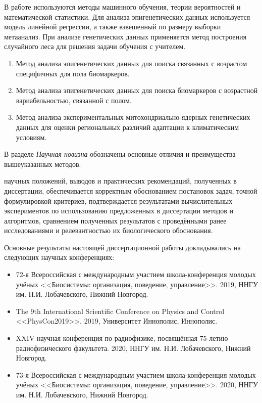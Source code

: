 {\methods} В работе используются методы машинного обучения, теории вероятностей и математической статистики. Для анализа эпигенетических данных используется модель линейной регрессии, а также взвешенный по размеру выборки метаанализ. При анализе генетических данных применяется метод построения случайного леса для решения задачи обучения с учителем. 

{}
\begin{enumerate}[beginpenalty=10000]
	\item Метод анализа эпигенетических данных для поиска связанных с возрастом специфичных для пола биомаркеров.
	\item Метод анализа эпигенетических данных для поиска биомаркеров с возрастной вариабельностью, связанной с полом.
	\item Метод анализа экспериментальных митохондриально-ядерных генетических данных для оценки региональных различий адаптации к климатическим условиям.
\end{enumerate}

В разделе \textit{Научная новизна} обозначены основные отличия и преимущества вышеуказанных методов.

{\reliability} научных положений, выводов и практических рекомендаций, полученных в диссертации, обеспечивается корректным обоснованием постановок задач, точной формулировкой критериев,  подтверждается результатами вычислительных экспериментов по использованию предложенных в диссертации методов и алгоритмов, сравнением полученных результатов с проведёнными ранее исследованиями и релевантностью их биологического обоснования.

{\probation} Основные результаты настоящей диссертационной работы докладывались на следующих научных конференциях:
\begin{itemize}[beginpenalty=10000]
	\item 72-я Всероссийская с международным участием школа-конференция молодых учёных <<Биосистемы: организация, поведение, управление>>. 2019, ННГУ им. Н.И. Лобачевского, Нижний Новгород.
	\item The 9th International Scientific Conference on Physics and Control <<PhysCon2019>>. 2019, Университет Иннополис, Иннополис.
	\item XXIV научная конференция по радиофизике, посвящённая 75-летию радиофизического факультета. 2020, ННГУ им. Н.И. Лобачевского, Нижний Новгород.
	\item 73-я Всероссийская с международным участием школа-конференция молодых учёных <<Биосистемы: организация, поведение, управление>>. 2020, ННГУ им. Н.И. Лобачевского, Нижний Новгород.
\end{itemize}


